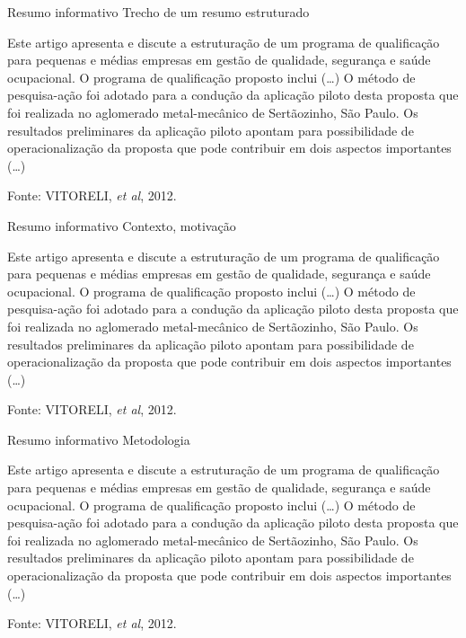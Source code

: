 \documentclass{beamer}
\begin{document}
\begin{frame}{Resumo informativo}
Trecho de um resumo estruturado
  \begin{example}
    Este artigo apresenta e discute a estruturação de um programa de
    qualificação para pequenas e médias empresas em gestão de
    qualidade, segurança e saúde ocupacional. O programa de
    qualificação proposto inclui (\ldots) O método de pesquisa-ação
    foi adotado para a condução da aplicação piloto desta proposta que
    foi realizada no aglomerado metal-mecânico de Sertãozinho, São
    Paulo. Os resultados preliminares da aplicação piloto apontam para
    possibilidade de operacionalização da proposta que pode contribuir
    em dois aspectos importantes (\ldots)
  \end{example}
  Fonte: VITORELI, {\em et al}, 2012.
\end{frame}
\begin{frame}{Resumo informativo}
  Contexto, motivação
  \begin{example}
    \alert{Este artigo apresenta e discute a estruturação de um
      programa de qualificação para pequenas e médias empresas em
      gestão de qualidade, segurança e saúde ocupacional. O programa
      de qualificação proposto inclui} (\ldots) O método de
    pesquisa-ação foi adotado para a condução da aplicação piloto
    desta proposta que foi realizada no aglomerado metal-mecânico de
    Sertãozinho, São Paulo. Os resultados preliminares da aplicação
    piloto apontam para possibilidade de operacionalização da proposta
    que pode contribuir em dois aspectos importantes (\ldots)
  \end{example}
  Fonte: VITORELI, {\em et al}, 2012.
\end{frame}

\begin{frame}{Resumo informativo}
  Metodologia
  \begin{example}
    Este artigo apresenta e discute a estruturação de um programa de
    qualificação para pequenas e médias empresas em gestão de
    qualidade, segurança e saúde ocupacional. O programa de
    qualificação proposto inclui (\ldots) \alert{O método de
      pesquisa-ação foi adotado para a condução da aplicação piloto
      desta proposta que foi realizada no aglomerado metal-mecânico de
      Sertãozinho, São Paulo.} Os resultados preliminares da aplicação
    piloto apontam para possibilidade de operacionalização da proposta
    que pode contribuir em dois aspectos importantes (\ldots)
  \end{example}
  Fonte: VITORELI, {\em et al}, 2012.
\end{frame}
\end{document}
